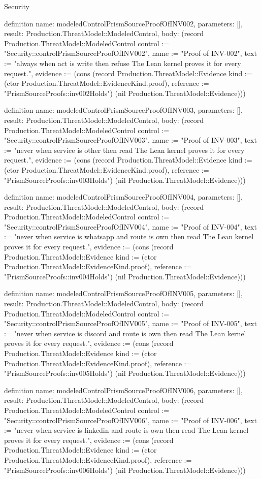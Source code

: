 \begin{lexlean}{Security}
\begin{semanticmodule}
definition{
  name: modeledControlPrismSourceProofOfINV002,
  parameters: [],
  result: Production.ThreatModel::ModeledControl,
  body: (record Production.ThreatModel::ModeledControl {control := "Security::controlPrismSourceProofOfINV002", name := "Proof of INV-002", text := "always when act is write then refuse The Lean kernel proves it for every request.", evidence := (cons (record Production.ThreatModel::Evidence {kind := (ctor Production.ThreatModel::EvidenceKind.proof), reference := "PrismSourceProofs::inv002Holds"}) (nil Production.ThreatModel::Evidence))})
}

definition{
  name: modeledControlPrismSourceProofOfINV003,
  parameters: [],
  result: Production.ThreatModel::ModeledControl,
  body: (record Production.ThreatModel::ModeledControl {control := "Security::controlPrismSourceProofOfINV003", name := "Proof of INV-003", text := "never when service is other then read The Lean kernel proves it for every request.", evidence := (cons (record Production.ThreatModel::Evidence {kind := (ctor Production.ThreatModel::EvidenceKind.proof), reference := "PrismSourceProofs::inv003Holds"}) (nil Production.ThreatModel::Evidence))})
}

definition{
  name: modeledControlPrismSourceProofOfINV004,
  parameters: [],
  result: Production.ThreatModel::ModeledControl,
  body: (record Production.ThreatModel::ModeledControl {control := "Security::controlPrismSourceProofOfINV004", name := "Proof of INV-004", text := "never when service is whatsapp and route is own then read The Lean kernel proves it for every request.", evidence := (cons (record Production.ThreatModel::Evidence {kind := (ctor Production.ThreatModel::EvidenceKind.proof), reference := "PrismSourceProofs::inv004Holds"}) (nil Production.ThreatModel::Evidence))})
}

definition{
  name: modeledControlPrismSourceProofOfINV005,
  parameters: [],
  result: Production.ThreatModel::ModeledControl,
  body: (record Production.ThreatModel::ModeledControl {control := "Security::controlPrismSourceProofOfINV005", name := "Proof of INV-005", text := "never when service is discord and route is own then read The Lean kernel proves it for every request.", evidence := (cons (record Production.ThreatModel::Evidence {kind := (ctor Production.ThreatModel::EvidenceKind.proof), reference := "PrismSourceProofs::inv005Holds"}) (nil Production.ThreatModel::Evidence))})
}

definition{
  name: modeledControlPrismSourceProofOfINV006,
  parameters: [],
  result: Production.ThreatModel::ModeledControl,
  body: (record Production.ThreatModel::ModeledControl {control := "Security::controlPrismSourceProofOfINV006", name := "Proof of INV-006", text := "never when service is linkedin and route is own then read The Lean kernel proves it for every request.", evidence := (cons (record Production.ThreatModel::Evidence {kind := (ctor Production.ThreatModel::EvidenceKind.proof), reference := "PrismSourceProofs::inv006Holds"}) (nil Production.ThreatModel::Evidence))})
}


\end{semanticmodule}
\end{lexlean}
